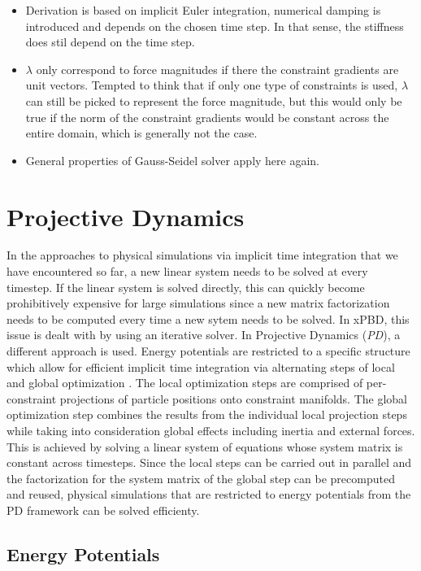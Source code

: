 \begin{itemize}
\begin{itemize}
        \end{itemize}
    \item Derivation is based on implicit Euler integration, numerical damping is introduced and depends on the chosen time step. In that sense, the 
        stiffness does stil depend on the time step.
    \item $\lambda$ only correspond to force magnitudes if there the constraint gradients are unit vectors. Tempted to think that if only one type of
        constraints is used, $\lambda$ can still be picked to represent the force magnitude, but this would only be true if the norm of the constraint
        gradients would be constant across the entire domain, which is generally not the case.
    \item General properties of Gauss-Seidel solver apply here again.
\end{itemize}

\section{Projective Dynamics}\label{s:pd}

In the approaches to physical simulations via implicit time integration that we have encountered so far, a new linear system needs to be solved
at every timestep. If the linear system is solved directly, this can quickly become prohibitively expensive for large simulations since 
a new matrix factorization needs to be computed every time a new sytem needs to be solved. In xPBD, this issue is dealt with by using an iterative 
solver. In Projective Dynamics (\emph{PD}), a different approach is used. Energy potentials are restricted to a specific structure which allow for 
efficient implicit time integration via alternating steps of local and global optimization \cite{bouaziz2014}. The local optimization 
steps are comprised of 
per-constraint projections of particle positions onto constraint manifolds. The global optimization step combines the results from the individual 
local projection steps while taking into consideration global effects including inertia and external forces. This is achieved by solving a 
linear system of equations whose system matrix is constant across timesteps. Since the local steps can be carried out in parallel and the 
factorization for the system matrix of the global step can be precomputed and reused, physical simulations that are restricted to energy potentials 
from the PD framework can be solved efficienty.

\subsection{Energy Potentials}\label{ss:pd-potentials}

